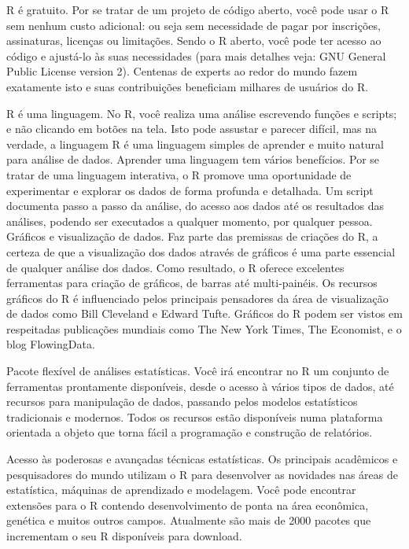 \documentclass[
]{article}
\begin{document}
R é gratuito. Por se tratar de um projeto de código aberto, você pode usar o R sem nenhum custo adicional: ou seja sem necessidade de pagar por inscrições, assinaturas, licenças ou limitações. Sendo o R aberto, você pode ter acesso ao código e ajustá-lo às suas necessidades (para mais detalhes veja: GNU General Public License version 2). Centenas de experts ao redor do mundo fazem exatamente isto e suas contribuições beneficiam milhares de usuários do R.

R é uma linguagem. No R, você realiza uma análise escrevendo funções e scripts; e não clicando em botões na tela. Isto pode assustar e parecer difícil, mas na verdade, a linguagem R é uma linguagem simples de aprender e muito natural para análise de dados. Aprender uma linguagem tem vários benefícios. Por se tratar de uma linguagem interativa, o R promove uma oportunidade de experimentar e explorar os dados de forma profunda e detalhada. Um script documenta passo a passo da análise, do acesso aos dados até os resultados das análises, podendo ser executados a qualquer momento, por qualquer pessoa.
Gráficos e visualização de dados. Faz parte das premissas de criações do R, a certeza de que a visualização dos dados através de gráficos é uma parte essencial de qualquer análise dos dados. Como resultado, o R oferece excelentes ferramentas para criação de gráficos, de barras até multi-painéis. Os recursos gráficos do R é influenciado pelos principais pensadores da área de visualização de dados como Bill Cleveland e Edward Tufte. Gráficos do R podem ser vistos em respeitadas publicações mundiais como The New York Times, The Economist, e o blog FlowingData.

Pacote flexível de análises estatísticas. Você irá encontrar no R um conjunto de ferramentas prontamente disponíveis, desde o acesso à vários tipos de dados, até recursos para manipulação de dados, passando pelos modelos estatísticos tradicionais e modernos. Todos os recursos estão disponíveis numa plataforma orientada a objeto que torna fácil a programação e construção de relatórios.

Acesso às poderosas e avançadas técnicas estatísticas. Os principais acadêmicos e pesquisadores do mundo utilizam o R para desenvolver as novidades nas áreas de estatística, máquinas de aprendizado e modelagem. Você pode encontrar extensões para o R contendo desenvolvimento de ponta na área econômica, genética e muitos outros campos. Atualmente são mais de 2000 pacotes que incrementam o seu R disponíveis para download.
\end{document}
